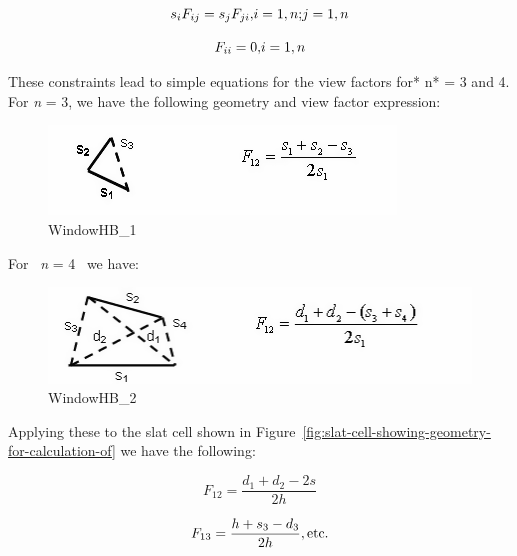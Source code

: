 \begin{equation}
{s_i}{F_{ij}} = {s_j}{F_{ji}}{\rm{,  }}i = 1,n{\rm{;  }}j = 1,n
\end{equation}

\begin{equation}
{F_{ii}} = 0{\rm{,  }}i = 1,n
\end{equation}

These constraints lead to simple equations for the view factors for* n* = 3 and 4. For \emph{n} = 3, we have the following geometry and view factor expression:

\begin{figure}[htbp]
\centering
\includegraphics{media/image1059.png}
\caption{WindowHB\_1}
\end{figure}

For~ \emph{n} = 4~ we have:

\begin{figure}[htbp]
\centering
\includegraphics{media/image1060.png}
\caption{WindowHB\_2}
\end{figure}

Applying these to the slat cell shown in Figure~\ref{fig:slat-cell-showing-geometry-for-calculation-of} we have the following:

\begin{equation}
{F_{12}} = \frac{{{d_1} + {d_2} - 2s}}{{2h}}
\end{equation}

\begin{equation}
{F_{13}} = \frac{{h + {s_3} - {d_3}}}{{2h}}{\rm{ ,  etc}}{\rm{.}}
\end{equation}

